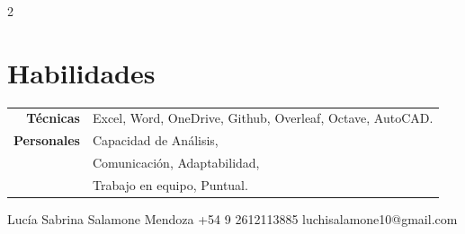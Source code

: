 \documentclass[lighthipster]{simplehipstercv}
\begin{document}
\begin{paracol}{2}
\begin{minipage}[t]{0.3\textwidth}
\end{minipage}\hfill
\begin{minipage}[t]{0.3\textwidth}
\section*{Habilidades}
\begin{tabular}{>{\footnotesize\bfseries}r >{\footnotesize}p{}}
    Técnicas & Excel, Word, OneDrive, Github, Overleaf, Octave, AutoCAD. \\
    Personales & Capacidad de Análisis, \\
    & Comunicación, Adaptabilidad, \\
    & Trabajo en equipo, Puntual.
\end{tabular}

\end{minipage}






\vfill{} %

\setlength{\parindent}{0pt}

\begin{center}\fontfamily{\sfdefault}\selectfont \color{black!70}
{\small Lucía Sabrina Salamone  Mendoza  +54 9 2612113885 \newline{} luchisalamone10@gmail.com
}
\end{center}


\end{paracol}
\end{document}
